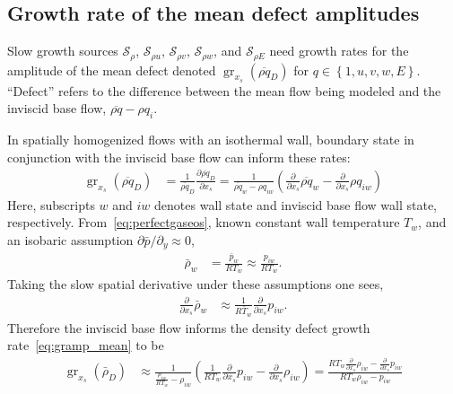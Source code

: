 \documentclass[letterpaper,11pt,nointlimits,reqno,draft]{amsbook}
\newcommand{\Ssd}{\ensuremath{\mathcal{S}}} %
\begin{document}
\subsection{Growth rate of the mean defect amplitudes}
\label{sec:slowgrowthgramp_mean}

Slow growth sources $\Ssd_\rho$, $\Ssd_{\rho u}$, $\Ssd_{\rho v}$, $\Ssd_{\rho
w}$, and $\Ssd_{\rho E}$ need growth rates for the amplitude of the mean defect
denoted $\operatorname{gr}_{x_s}\!\left(\overline{\rho q}_{D}\right)$ for
$q\in\left\{1,u,v,w,E\right\}$.  ``Defect'' refers to the difference between the
mean flow being modeled and the inviscid base flow, $\overline{\rho q} - {\rho
q}_i$.

In spatially homogenized flows with an isothermal wall, boundary state in
conjunction with the inviscid base flow can inform these rates:
\begin{align}
    \label{eq:gramp_mean}
    \operatorname{gr}_{x_s}\!\left(\overline{\rho q}_{D}\right)
    &=
    \frac{1}{\overline{\rho q}_{D}}
    \frac{\partial \overline{\rho q}_D}{\partial x_s}
    =
    \frac{1}{\overline{\rho q}_{w} - {\rho q}_{iw}}
    \left(
          \frac{\partial}{\partial x_s} \overline{\rho q}_{w}
        - \frac{\partial}{\partial x_s}          {\rho q}_{iw}
    \right)
\end{align}
Here, subscripts $w$ and $iw$ denotes wall state and inviscid base flow wall
state, respectively.  From~\eqref{eq:perfectgaseos}, known constant wall
temperature $T_w$, and an isobaric assumption $\partial \bar{p} / \partial_y
\approx 0$,
\begin{align}
    \bar{\rho}_w
    &= \frac{\bar{p}_{ w}}{R T_w}
    \approx \frac{p_{iw}}{R T_w}.
\end{align}
Taking the slow spatial derivative under these assumptions one sees,
\begin{align}
    \frac{\partial}{\partial x_s} \bar{\rho}_w
    &\approx \frac{1}{R \bar{T}_w} \frac{\partial}{\partial x_s} p_{iw}.
\end{align}
Therefore the inviscid base flow informs the density defect growth
rate~\eqref{eq:gramp_mean} to be
\begin{align}
    \label{eq:gramp_mean_rho}
    \operatorname{gr}_{x_s}\!\left(\bar{\rho}_{D}\right)
    &\approx
    \frac{1}{\frac{p_{iw}}{R T_w} - {\rho}_{iw}}
    \left(
          \frac{1}{R T_w} \frac{\partial}{\partial x_s} {p   }_{iw}
        -                 \frac{\partial}{\partial x_s} {\rho}_{iw}
    \right)
    =
    \frac{
          R T_w \frac{\partial}{\partial x_s} \rho_{iw}
        -       \frac{\partial}{\partial x_s}    p_{iw}
    }{
          {R T_w} \rho_{iw} - p_{iw}
    }
\end{align}
\end{document}
